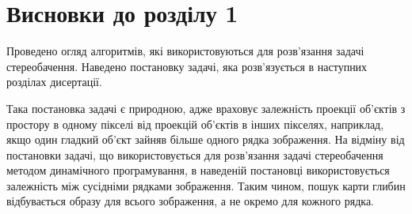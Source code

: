 \section*{Висновки до розділу 1}

Проведено огляд алгоритмів,
які використовуються для розв'язання задачі стереобачення.
Наведено постановку задачі,
яка розв'язується в наступних розділах дисертації.

Така постановка задачі є природною,
адже враховує залежність проекції об'єктів з простору
в одному пікселі від проекцій об'єктів в інших пікселях,
наприклад, якщо один гладкий об'єкт зайняв більше одного рядка зображення.
На відміну від постановки задачі,
що використовується для
розв'язання задачі стереобачення методом динамічного програмування,
в наведеній постановці використовується залежність між сусідніми рядками
зображення.
Таким чином, пошук карти глибин відбувається образу для всього зображення,
а не окремо для кожного рядка.
